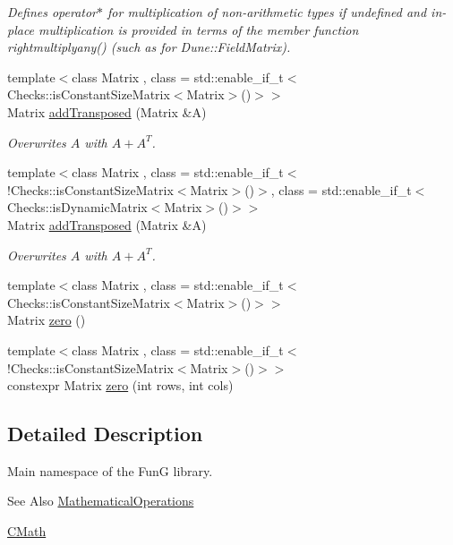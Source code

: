 \begin{DoxyCompactItemize}
\begin{DoxyCompactList}\small\item\em Defines operator$\ast$ for multiplication of non-\/arithmetic types if undefined and in-\/place multiplication is provided in terms of the member function rightmultiplyany() (such as for Dune\-::\-Field\-Matrix). \end{DoxyCompactList}\item 
{\footnotesize template$<$class Matrix , class  = std\-::enable\-\_\-if\-\_\-t$<$\-Checks\-::is\-Constant\-Size\-Matrix$<$\-Matrix$>$()$>$$>$ }\\Matrix \hyperlink{namespaceFunG_a0211d0d26c669d56b5113fd2292902e5}{add\-Transposed} (Matrix \&A)
\begin{DoxyCompactList}\small\item\em Overwrites $A$ with $A+A^T$. \end{DoxyCompactList}\item 
{\footnotesize template$<$class Matrix , class  = std\-::enable\-\_\-if\-\_\-t$<$!\-Checks\-::is\-Constant\-Size\-Matrix$<$\-Matrix$>$()$>$, class  = std\-::enable\-\_\-if\-\_\-t$<$\-Checks\-::is\-Dynamic\-Matrix$<$\-Matrix$>$()$>$$>$ }\\Matrix \hyperlink{namespaceFunG_af07d74bcaa0a3b7dbb4eee50d2edf2ff}{add\-Transposed} (Matrix \&A)
\begin{DoxyCompactList}\small\item\em Overwrites $A$ with $A+A^T$. \end{DoxyCompactList}\item 
{\footnotesize template$<$class Matrix , class  = std\-::enable\-\_\-if\-\_\-t$<$\-Checks\-::is\-Constant\-Size\-Matrix$<$\-Matrix$>$()$>$$>$ }\\Matrix \hyperlink{namespaceFunG_a649b4470d6def401959bfea3a368c48c}{zero} ()
\item 
{\footnotesize template$<$class Matrix , class  = std\-::enable\-\_\-if\-\_\-t$<$!\-Checks\-::is\-Constant\-Size\-Matrix$<$\-Matrix$>$()$>$$>$ }\\constexpr Matrix \hyperlink{namespaceFunG_ae633433339ba30207aa526e54e3924b4}{zero} (int rows, int cols)
\end{DoxyCompactItemize}


\subsection{Detailed Description}
Main namespace of the Fun\-G library. \begin{DoxySeeAlso}{See Also}
\hyperlink{namespaceMathematicalOperations}{Mathematical\-Operations} 

\hyperlink{namespaceCMath}{C\-Math} 
\end{DoxySeeAlso}


